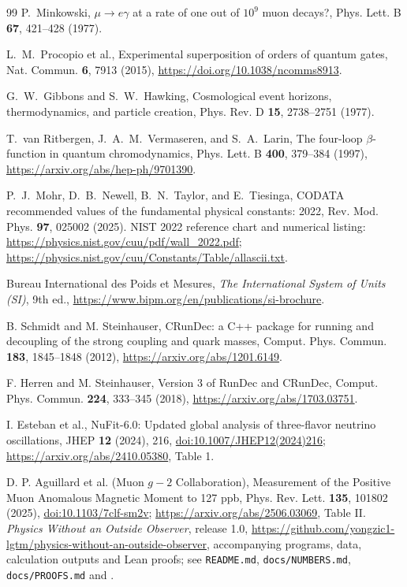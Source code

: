 \documentclass[aps,prx,onecolumn,10pt,notitlepage,nofootinbib,longbibliography]{revtex4-2}
\numberwithin{equation}{section}
\numberwithin{table}{section}
\begin{document}
\begin{thebibliography}{99}
P.~Minkowski, $\mu\to e\gamma$ at a rate of one out of $10^9$ muon decays?,
Phys. Lett. B \textbf{67}, 421--428 (1977).

L.~M.~Procopio et al., Experimental superposition of orders of quantum gates,
Nat. Commun. \textbf{6}, 7913 (2015),
\url{https://doi.org/10.1038/ncomms8913}.

G.~W.~Gibbons and S.~W.~Hawking, Cosmological event horizons, thermodynamics, and particle creation,
Phys. Rev. D \textbf{15}, 2738--2751 (1977).

T.~van Ritbergen, J.~A.~M.~Vermaseren, and S.~A.~Larin,
The four-loop $\beta$-function in quantum chromodynamics,
Phys. Lett. B \textbf{400}, 379--384 (1997),
\url{https://arxiv.org/abs/hep-ph/9701390}.

P.~J.~Mohr, D.~B.~Newell, B.~N.~Taylor, and E.~Tiesinga,
CODATA recommended values of the fundamental physical constants: 2022,
Rev. Mod. Phys. \textbf{97}, 025002 (2025).
NIST 2022 reference chart and numerical listing:
\url{https://physics.nist.gov/cuu/pdf/wall_2022.pdf};
\url{https://physics.nist.gov/cuu/Constants/Table/allascii.txt}.

Bureau International des Poids et Mesures,
\emph{The International System of Units (SI)}, 9th ed.,
\url{https://www.bipm.org/en/publications/si-brochure}.

B. Schmidt and M. Steinhauser, CRunDec: a C++ package for running and decoupling of the strong coupling and quark masses,
Comput. Phys. Commun. \textbf{183}, 1845--1848 (2012),
\url{https://arxiv.org/abs/1201.6149}.

F. Herren and M. Steinhauser, Version 3 of RunDec and CRunDec,
Comput. Phys. Commun. \textbf{224}, 333--345 (2018),
\url{https://arxiv.org/abs/1703.03751}.

I. Esteban et al., NuFit-6.0: Updated global analysis of three-flavor neutrino
oscillations, JHEP \textbf{12} (2024), 216,
\href{https://doi.org/10.1007/JHEP12(2024)216}{doi:10.1007/JHEP12(2024)216};
\url{https://arxiv.org/abs/2410.05380}, Table 1.

D. P. Aguillard et al. (Muon $g-2$ Collaboration), Measurement of the Positive Muon Anomalous Magnetic Moment to 127 ppb,
Phys. Rev. Lett. \textbf{135}, 101802 (2025),
\href{https://doi.org/10.1103/7clf-sm2v}{doi:10.1103/7clf-sm2v};
\url{https://arxiv.org/abs/2506.03069}, Table II.
\emph{Physics Without an Outside Observer}, release 1.0, \url{https://github.com/yongzic1-lgtm/physics-without-an-outside-observer}, accompanying programs, data, calculation outputs and Lean proofs; see \texttt{README.md}, \texttt{docs/NUMBERS.md}, \texttt{docs/PROOFS.md} and .
\end{thebibliography}
\end{document}
